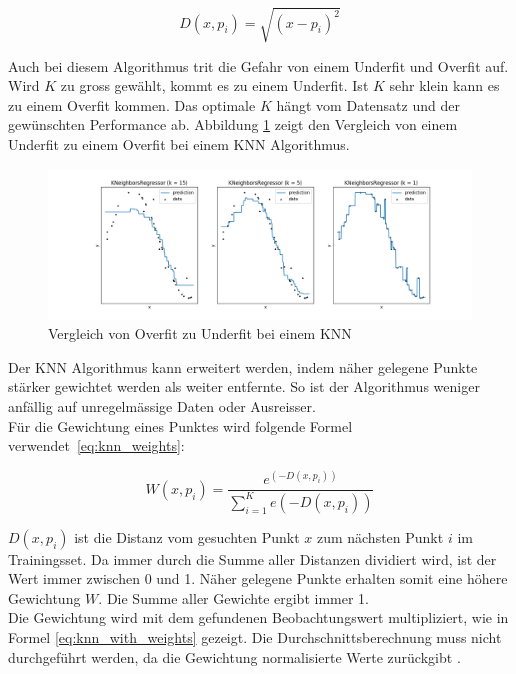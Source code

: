 \begin{equation}\label{eq:euklid}
D(x, p_i) = \sqrt{(x - p_i)^2}
\end{equation}

Auch bei diesem Algorithmus trit die Gefahr von einem Underfit und Overfit auf. Wird $K$ zu gross gewählt, kommt es zu einem Underfit. Ist $K$ sehr klein kann es zu einem Overfit kommen. Das optimale $K$ hängt vom Datensatz und der gewünschten Performance ab. Abbildung \ref{fig:under_overfit_knn} zeigt den Vergleich von einem Underfit zu einem Overfit bei einem KNN Algorithmus.

\begin{figure}[ht]\label{fig:under_overfit_knn}
\centering
\includegraphics[width=\textwidth]{images/knears_overfit.png}
\caption[Vergleich von Overfit zu Underfit bei einem KNN]{Vergleich von Overfit zu Underfit bei einem KNN}
\end{figure}

Der KNN Algorithmus kann erweitert werden, indem näher gelegene Punkte stärker gewichtet werden als weiter entfernte. So ist der Algorithmus weniger anfällig auf unregelmässige Daten oder Ausreisser.\\
Für die Gewichtung eines Punktes wird folgende Formel verwendet~\eqref{eq:knn_weights}:

\begin{equation}
\label{eq:knn_weights}
W(x, p_i) = \frac{e^{(-D(x, p_i))}}{\sum_{i=1}^{K} e(-D(x, p_i))}
\end{equation}

$D(x, p_i)$ ist die Distanz vom gesuchten Punkt $x$ zum nächsten Punkt $i$ im Trainingsset. Da immer durch die Summe aller Distanzen dividiert wird, ist der Wert immer zwischen 0 und 1. Näher gelegene Punkte erhalten somit eine höhere Gewichtung $W$. Die Summe aller Gewichte ergibt immer 1.\\
Die Gewichtung wird mit dem gefundenen Beobachtungswert multipliziert, wie in Formel \eqref{eq:knn_with_weights} gezeigt. Die Durchschnittsberechnung muss nicht durchgeführt werden, da die Gewichtung normalisierte Werte zurückgibt \cite{knn_2, knn_3}.


